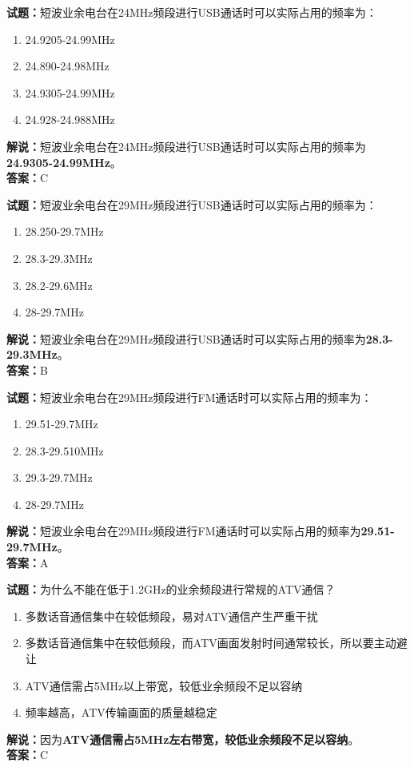 \documentclass{ctexbook}
\begin{document}
\bigskip


\noindent\textbf{试题：}短波业余电台在24\unit{\MHz}频段进行USB通话时可以实际占用的频率为：
\begin{enumerate}[leftmargin=3em]
\item 24.9205-24.99\unit{\MHz}
\item 24.890-24.98\unit{\MHz}
\item 24.9305-24.99\unit{\MHz}
\item 24.928-24.988\unit{\MHz}
\end{enumerate}
\noindent\textbf{解说：}短波业余电台在24\unit{\MHz}频段进行USB通话时可以实际占用的频率为\textbf{24.9305-24.99\unit{\MHz}}。\\\noindent\textbf{答案：}C




\bigskip


\noindent\textbf{试题：}短波业余电台在29\unit{\MHz}频段进行USB通话时可以实际占用的频率为：
\begin{enumerate}[leftmargin=3em]
\item 28.250-29.7\unit{\MHz}
\item 28.3-29.3\unit{\MHz}
\item 28.2-29.6\unit{\MHz}
\item 28-29.7\unit{\MHz}
\end{enumerate}
\noindent\textbf{解说：}短波业余电台在29\unit{\MHz}频段进行USB通话时可以实际占用的频率为\textbf{28.3-29.3\unit{\MHz}}。\\\noindent\textbf{答案：}B



\bigskip


\noindent\textbf{试题：}短波业余电台在29\unit{\MHz}频段进行FM通话时可以实际占用的频率为：
\begin{enumerate}[leftmargin=3em]
\item 29.51-29.7\unit{\MHz}
\item 28.3-29.510\unit{\MHz}%
\item 29.3-29.7\unit{\MHz}
\item 28-29.7\unit{\MHz}
\end{enumerate}
\noindent\textbf{解说：}短波业余电台在29\unit{\MHz}频段进行FM通话时可以实际占用的频率为\textbf{29.51-29.7\unit{\MHz}}。\\\noindent\textbf{答案：}A



\bigskip


\noindent\textbf{试题：}为什么不能在低于1.2\unit{\GHz}的业余频段进行常规的ATV通信？
\begin{enumerate}[leftmargin=3em]
\item 多数话音通信集中在较低频段，易对ATV通信产生严重干扰
\item 多数话音通信集中在较低频段，而ATV画面发射时间通常较长，所以要主动避让
\item ATV通信需占5\unit{\MHz}以上带宽，较低业余频段不足以容纳
\item 频率越高，ATV传输画面的质量越稳定
\end{enumerate}
\noindent\textbf{解说：}因为\textbf{ATV通信需占5\unit{\MHz}左右带宽，较低业余频段不足以容纳}。\\\noindent\textbf{答案：}C
\end{document}
